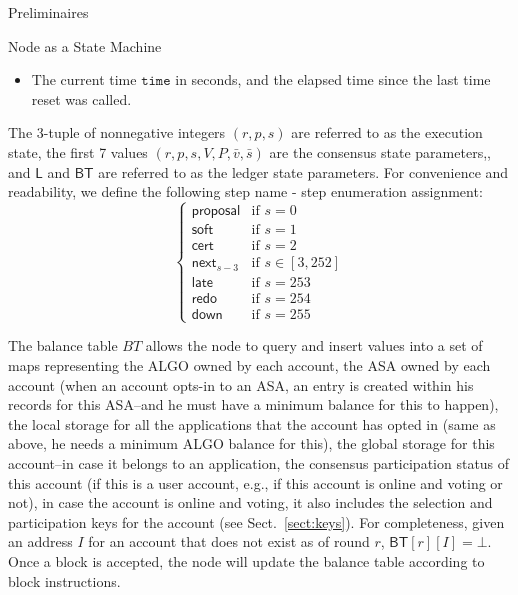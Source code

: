 \documentclass[10pt,a4paper]{article}
\begin{document}
\begin{section}{Preliminaires}
\begin{subsection}{Node as a State Machine}
\begin{itemize}
    \item 
    The current time $\mathtt{time}$ in seconds, and the elapsed time since the last
    time reset was called.
\end{itemize}
The 3-tuple of nonnegative integers $(r, p, s)$ are referred to as the {\sf execution state},
the first 7 values $(r, p, s, V, P, \bar{v}, \bar{s})$ are the 
{\sf consensus state parameters},,
and $\mathsf{L}$ and $\mathsf{BT}$ are referred to as the {\sf ledger state parameters}.
For convenience and readability, we define the following step name - step enumeration assignment:
\begin{equation}\label{table:s}
\left\{    
    \begin{array}{ll}
        \mathsf{proposal}&\mbox{if }s=0 \\
        \mathsf{soft}&\mbox{if }s=1 \\
        \mathsf{cert}&\mbox{if }s=2\\
        \mathsf{next}_{s-3}&\mbox{if }s\in [3, 252]\\
        \mathsf{late}&\mbox{if }s=253\\
        \mathsf{redo}&\mbox{if }s=254\\
        \mathsf{down}&\mbox{if }s=255
    \end{array}
\right.
\end{equation}

The balance table $BT$ allows the node to query and insert values into a set of maps representing
      the ALGO owned by each account, 
      the ASA owned by each account (when an account opts-in to an ASA, an entry is created within his records for
        this ASA--and he must have a minimum balance for this to happen),
      the local storage for all the applications that the account has opted in (same as above, he needs a minimum
        ALGO balance for this),
      the global storage for this account--in case it belongs to an application,
      the consensus participation status of this account (if this is a user account, e.g., if this account 
        is online and voting or not),
      in case the account is online and voting, it also includes the selection and participation keys for
        the account (see Sect.~\ref{sect:keys}).
        For completeness, given an address $I$ for an account that does not exist as of round $r$,
        $\mathsf{BT}[r][I] = \bot$.
Once a block is accepted, the node will update the balance table according to block instructions.



\end{subsection}
\end{section}
\end{document}
